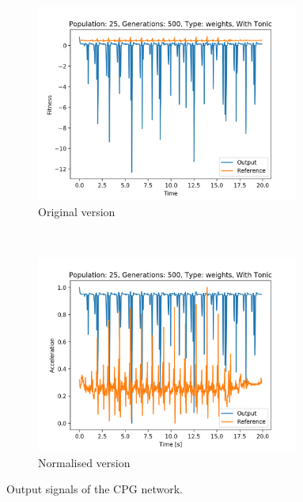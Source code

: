 \begin{figure}[t!]
    \centering
    \begin{subfigure}[b]{0.45\textwidth}
        \centering
        \includegraphics[width=0.95\textwidth]{include/figure/output_pop25_gen500_type0_with.png}
        \caption{Original version}
    \end{subfigure}
    ~ 
    \begin{subfigure}[b]{0.45\textwidth}
        \centering
        \includegraphics[width=0.95\textwidth]{include/figure/output_pop25_gen500_type0_with_normalised.png}
        \caption{Normalised version}
    \end{subfigure}%
    \caption{Output signals of the CPG network.}
    \label{fig:result_2}
\end{figure}
